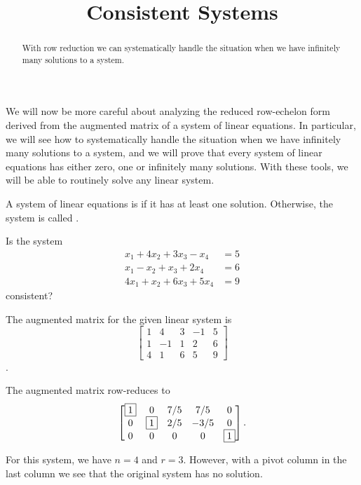 \documentclass{ximera}
\title{Consistent Systems}
\begin{document}
\begin{abstract}
  With row reduction we can systematically handle the situation when we
  have infinitely many solutions to a system.
\end{abstract}
\maketitle

We will now be more careful about analyzing the reduced row-echelon form derived from the  augmented matrix of a system of linear equations.    In particular, we will see how to systematically handle the situation when we have infinitely many solutions to a system, and we will prove that every system of linear equations has either zero, one or infinitely many solutions.  With these tools, we will be able to routinely solve any linear system.

\begin{definition}
\label{definition:CS}
A system of linear equations is  if it has at least one solution.  Otherwise, the system is called .
\end{definition}

\begin{exercise}
  Is the system
  \begin{align*}
    x_1 + 4x_2 + 3x_3 - x_4 &= 5\\
    x_1 - x_2 + x_3 + 2x_4 &= 6\\
    4x_1 + x_2 + 6x_3 + 5x_4 &= 9
  \end{align*}
  consistent?

  \begin{multipleChoice}
  \end{multipleChoice}

  \begin{hint}
    The augmented matrix for the given linear system is
    \[
      \begin{bmatrix}
        1 & 4 & 3 & -1 & 5\\
        1 & -1 & 1 & 2 & 6\\
        4 & 1 & 6 & 5 & 9
      \end{bmatrix}
    \].
  \end{hint}

  \begin{hint}
    The augmented matrix row-reduces to
    \[\begin{bmatrix}
        \fbox{1} & 0 & 7/5 & 7/5 & 0\\
        0 & \fbox{1} & 2/5 & -3/5 & 0\\
        0 & 0 & 0 & 0 & \fbox{1}
      \end{bmatrix}.\]
  \end{hint}

  \begin{hint}
    For this system, we have $n = 4$ and $r = 3$.  However, with a
    pivot column in the last column we see that the original system
    has no solution.
  \end{hint}
\end{exercise}
\end{document}
